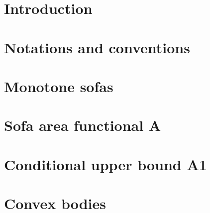 \section{Introduction}
\label{sec:introduction}


\section{Notations and conventions}
\label{sec:notations-and-conventions}


\section{Monotone sofas}
\label{sec:monotone-sofas}


\section{Sofa area functional A}
\label{sec:sofa-area-functional-a}


\section{Conditional upper bound A1}
\label{sec:conditional-upper-bound-a1}


\appendix
\section{Convex bodies}
\label{sec:convex-bodies}



